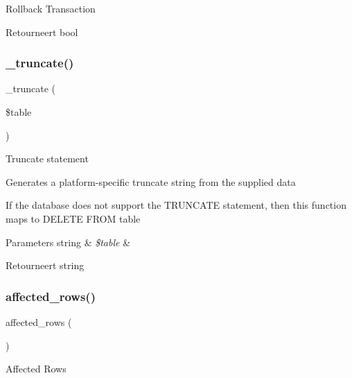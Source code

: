 Rollback Transaction

\begin{DoxyReturn}{Retourneert}
bool 
\end{DoxyReturn}
\mbox{\label{class_c_i___d_b__sqlite__driver_aa029600528fc1ce660a23ff4b4667f95}} 
\subsubsection{\texorpdfstring{\_truncate()}{\_truncate()}}
{\footnotesize\ttfamily \+\_\+truncate (\begin{DoxyParamCaption}\item[{}]{\$table }\end{DoxyParamCaption})\hspace{0.3cm}{\ttfamily [protected]}}

Truncate statement

Generates a platform-\/specific truncate string from the supplied data

If the database does not support the T\+R\+U\+N\+C\+A\+TE statement, then this function maps to \textquotesingle{}D\+E\+L\+E\+TE F\+R\+OM table\textquotesingle{}


\begin{DoxyParams}[1]{Parameters}
string & {\em \$table} & \\
\hline
\end{DoxyParams}
\begin{DoxyReturn}{Retourneert}
string 
\end{DoxyReturn}
\mbox{\label{class_c_i___d_b__sqlite__driver_a77248aaad33eb132c04cc4aa3f4bc8cb}} 
\subsubsection{\texorpdfstring{affected\_rows()}{affected\_rows()}}
{\footnotesize\ttfamily affected\+\_\+rows (\begin{DoxyParamCaption}{ }\end{DoxyParamCaption})}

Affected Rows

